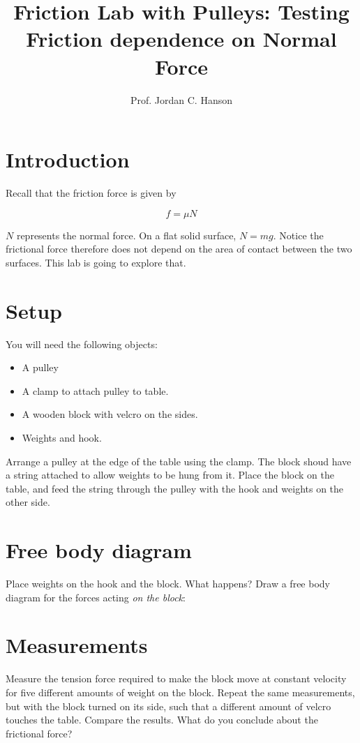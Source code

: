 \documentclass{article}
\begin{document}
\title{Friction Lab with Pulleys: Testing Friction dependence on Normal Force}
\author{Prof. Jordan C. Hanson}

\maketitle

\section{Introduction}

Recall that the friction force is given by

\begin{equation}
f = \mu N
\end{equation}

$N$ represents the normal force.  On a flat solid surface, $N = mg$.  Notice the frictional force therefore does not depend on the area of contact between the two surfaces.  This lab is going to explore that.

\section{Setup}

You will need the following objects:

\begin{itemize}
\item A pulley
\item A clamp to attach pulley to table.
\item A wooden block with velcro on the sides.
\item Weights and hook.
\end{itemize}

Arrange a pulley at the edge of the table using the clamp.  The block shoud have a string attached to allow weights to be hung from it.  Place the block on the table, and feed the string through the pulley with the hook and weights on the other side.

\section{Free body diagram}

Place weights on the hook and the block.  What happens?  Draw a free body diagram for the forces acting \textit{on the block}: \\ \vspace{3cm}

\section{Measurements}

Measure the tension force required to make the block move at constant velocity for five different amounts of weight on the block.  Repeat the same measurements, but with the block turned on its side, such that a different amount of velcro touches the table.  Compare the results.  What do you conclude about the frictional force?
\end{document}
